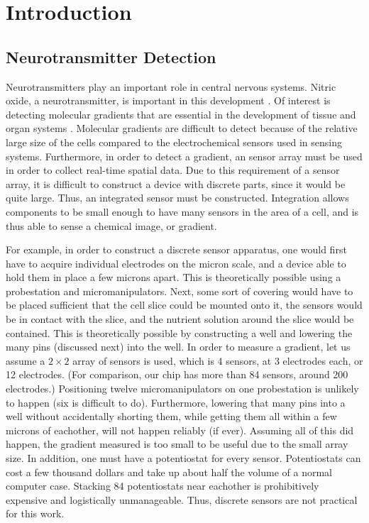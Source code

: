 \chapter{Introduction}

\section{Neurotransmitter Detection}

Neurotransmitters play an important role in central nervous systems. Nitric oxide, a neurotransmitter, is important in this development \cite{bicker2005sag} \cite{bulotta2005css} \cite{contestabile2004rno}. Of interest is detecting molecular gradients that are essential in the development of tissue and organ systems \cite{wolpert1996ohy} \cite{gurdon2001mgi}. Molecular gradients are difficult to detect because of the relative large size of the cells compared to the electrochemical sensors used in sensing systems. Furthermore, in order to detect a gradient, an sensor array must be used in order to collect real-time spatial data. Due to this requirement of a sensor array, it is difficult to construct a device with discrete parts, since it would be quite large. Thus, an integrated sensor must be constructed. Integration allows components to be small enough to have many sensors in the area of a cell, and is thus able to sense a chemical image, or gradient.

For example, in order to construct a discrete sensor apparatus, one would first have to acquire individual electrodes on the micron scale, and a device able to hold them in place a few microns apart. This is theoretically possible using a probestation and micromanipulators. Next, some sort of covering would have to be placed sufficient that the cell slice could be mounted onto it, the sensors would be in contact with the slice, and the nutrient solution around the slice would be contained. This is theoretically possible by constructing a well and lowering the many pins (discussed next) into the well. In order to measure a gradient, let us assume a $2 \times 2$ array of sensors is used, which is 4 sensors, at 3 electrodes each, or 12 electrodes. (For comparison, our chip has more than 84 sensors, around 200 electrodes.) Positioning twelve micromanipulators on one probestation is unlikely to happen (six is difficult to do). Furthermore, lowering that many pins into a well without accidentally shorting them, while getting them all within a few microns of eachother, will not happen reliably (if ever). Assuming all of this did happen, the gradient measured is too small to be useful due to the small array size. In addition, one must have a potentiostat for every sensor. Potentiostats can cost a few thousand dollars and take up about half the volume of a normal computer case. Stacking 84 potentiostats near eachother is prohibitively expensive and logistically unmanageable. Thus, discrete sensors are not practical for this work.

